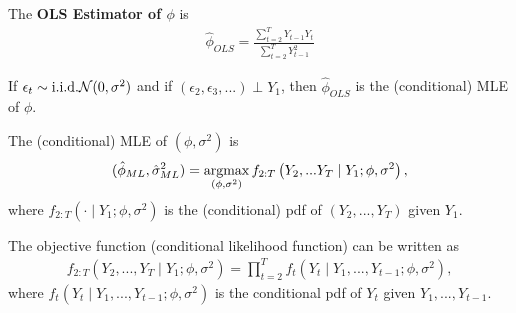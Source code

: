 \documentclass[11pt]{elegantbook}
\newcommand{\argmax}{\operatornamewithlimits{argmax}}
\begin{document}
The \textbf{OLS Estimator of $\phi$} is
\begin{equation}
    \begin{aligned}
        \hat{\phi}_{OLS}=\frac{\sum_{t=2}^TY_{t-1}Y_t}{\sum_{t=2}^T Y_{t-1}^2}
    \end{aligned}
    \nonumber
\end{equation}

\begin{claim}
    If $\epsilon_t\sim \textnormal{i.i.d.} \mathcal{N}(0,\sigma^2)$ and if $(\epsilon_2,\epsilon_3,...)\perp Y_1$, then $\hat{\phi}_{OLS}$ is the (conditional) MLE of $\phi$.
\end{claim}
The (conditional) MLE of $(\phi,\sigma^2)$ is
\begin{equation}
    \begin{aligned}
        (\hat{\phi}_{ML},\hat{\sigma}^2_{ML})=\argmax_{(\phi,\sigma^2)} f_{2:T}\left(Y_2,...Y_T\mid Y_1;\phi,\sigma^2\right),
    \end{aligned}
    \nonumber
\end{equation}
where $f_{2:T}(\cdot\mid Y_1; \phi,\sigma^2)$ is the (conditional) pdf of $(Y_2,...,Y_T)$ given $Y_1$.


\begin{definition}
    The objective function (conditional likelihood function) can be written as
    \begin{equation}
        \begin{aligned}
            f_{2:T}\left(Y_2,...,Y_T\mid Y_1;\phi,\sigma^2\right)=\prod_{t=2}^Tf_t\left(Y_t\mid Y_1,...,Y_{t-1};\phi,\sigma^2\right),
        \end{aligned}
        \nonumber
    \end{equation}
    where $f_t\left(Y_t\mid Y_1,...,Y_{t-1};\phi,\sigma^2\right)$ is the conditional pdf of $Y_t$ given $Y_1,...,Y_{t-1}$.
\end{definition}
\end{document}
